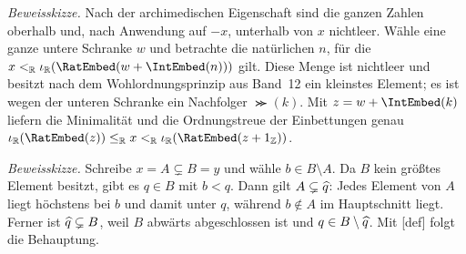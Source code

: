 \documentclass[main.tex]{subfiles}
\begin{document}

\emph{Beweisskizze.}
Nach der archimedischen Eigenschaft sind die ganzen Zahlen oberhalb und,
nach Anwendung auf \(-x\), unterhalb von \(x\) nichtleer. Wähle eine ganze
untere Schranke \(w\) und betrachte die natürlichen \(n\), für die
\(x\RealLt\RealEmb(\RatEmbed(w+\IntEmbed(n)))\) gilt. Diese Menge ist
nichtleer und besitzt nach dem Wohlordnungsprinzip aus Band~12 ein kleinstes
Element; es ist wegen der unteren Schranke ein Nachfolger \(\Succ(k)\).
Mit \(z=w+\IntEmbed(k)\) liefern die Minimalität und die Ordnungstreue der
Einbettungen genau
\(\RealEmb(\RatEmbed(z))\RealLe x
\RealLt\RealEmb(\RatEmbed(z+1_{\mathbb Z}))\).


\emph{Beweisskizze.}
Schreibe \(x=A\subsetneq B=y\) und wähle \(b\in B\setminus A\). Da \(B\)
kein größtes Element besitzt, gibt es \(q\in B\) mit \(b<q\). Dann gilt
\(A\subsetneq\widehat{q}\): Jedes Element von \(A\) liegt höchstens bei \(b\)
und damit unter \(q\), während \(b\notin A\) im Hauptschnitt liegt. Ferner
ist \(\widehat{q}\subsetneq B\), weil \(B\) abwärts abgeschlossen ist und
\(q\in B\setminus\widehat{q}\). Mit
[def] folgt die Behauptung.

\end{document}
